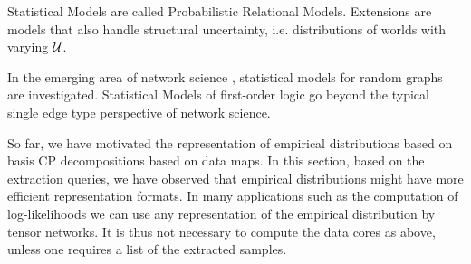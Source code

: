 




Statistical Models are called Probabilistic Relational Models. %
Extensions are models that also handle structural uncertainty, i.e. distributions of worlds with varying $\mathcal{U}$.

In the emerging area of network science \cite{barabasi_network_2016, giovanni_russo_vito_latora_complex_2017}, statistical models for random graphs are investigated.
Statistical Models of first-order logic go beyond the typical single edge type perspective of network science.


%
\begin{remark}
    So far, we have motivated the representation of empirical distributions based on basis CP decompositions based on data maps.
    In this section, based on the extraction queries, we have observed that empirical distributions might have more efficient representation formats.
    In many applications such as the computation of log-likelihoods we can use any representation of the empirical distribution by tensor networks.
    It is thus not necessary to compute the data cores as above, unless one requires a list of the extracted samples.
\end{remark}